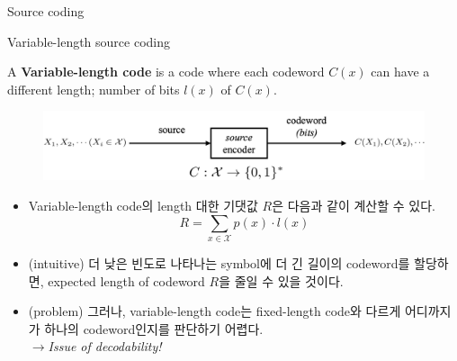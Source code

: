 \documentclass[9pt]{beamer}
\begin{document}
\begin{section}{Source coding}
        \begin{frame}{Variable-length source coding}
            \begin{definition}
                A \textbf{Variable-length code }is a code where each codeword $C(x)$ can have a different length; number of bits $l(x)$ of $C(x)$.
            \end{definition}
            \begin{figure}
                \includegraphics[width=0.8\columnwidth]{image/L3_variable_length.png}
            \end{figure}
            \begin{itemize}
                \item Variable-length code의 length 대한 기댓값 $R$은 다음과 같이 계산할 수 있다.
                $$R = \sum_{x \in \mathcal X} p(x) \cdot l(x)$$
                \item (intuitive) 더 낮은 빈도로 나타나는 symbol에 더 긴 길이의 codeword를 할당하면, expected length of codeword $R$을 줄일 수 있을 것이다.
                \item (problem) 그러나, variable-length code는 fixed-length code와 다르게 어디까지가 하나의 codeword인지를 판단하기 어렵다.
                \\$\rightarrow$\textit{Issue of \alert{decodability!}}
            \end{itemize}
            
        \end{frame}

    \end{section}
\end{document}
